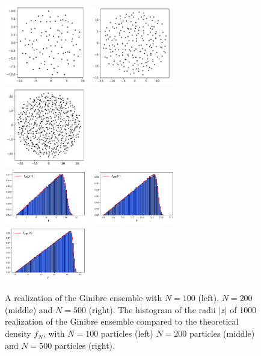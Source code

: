\documentclass[twoside,11pt]{book}
\numberwithin{theorem}{chapter}
\numberwithin{definition}{chapter}
\numberwithin{proposition}{chapter}
\numberwithin{corollary}{chapter}
\numberwithin{example}{chapter}
\numberwithin{lemma}{chapter}
\numberwithin{assumption}{chapter}
\begin{document}
\begin{figure}
\centering
\includegraphics[width= 0.32\textwidth]{img/Ginibre/Ginibre_100_example_id_1.pdf}~\includegraphics[width= 0.32\textwidth]{img/Ginibre/Ginibre_200_example_id_2.pdf}~
\includegraphics[width= 0.32\textwidth]{img/Ginibre/Ginibre_500_example_id_3.pdf}\\
\includegraphics[width= 0.32\textwidth]{img/Ginibre/Ginibre_histogram_1000_N_100_example_2.pdf}~
\includegraphics[width= 0.32\textwidth]{img/Ginibre/Ginibre_histogram_1000_N_200_example_2.pdf}~\includegraphics[width= 0.32\textwidth]{img/Ginibre/Ginibre_histogram_1000_N_500_example_2.pdf}
\caption{A realization of the Ginibre ensemble with $N = 100$ (left), $N = 200$ (middle) and $N = 500$ (right). The histogram of the radii $|z|$ of 1000 realization of the Ginibre ensemble compared to the theoretical density $f_{N}$, with $N = 100$ particles (left) $N = 200$ particles (middle) and $N = 500$ particles (right). \label{fig:ginibre}}
\end{figure}
\end{document}
